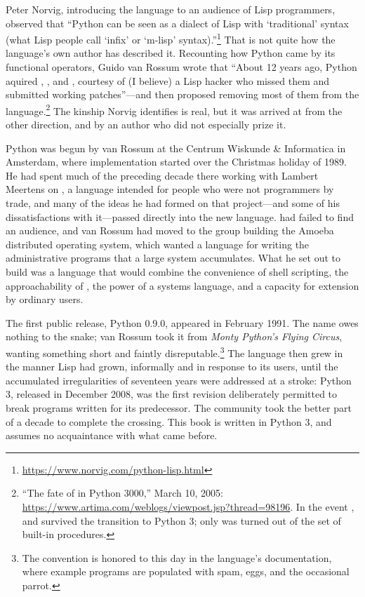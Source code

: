 Peter Norvig, introducing the language to an audience of Lisp programmers,
observed that ``Python can be seen as a dialect of Lisp with `traditional'
syntax (what Lisp people call `infix' or `m-lisp'
syntax).''\footnote{\url{https://www.norvig.com/python-lisp.html}} That is not
quite how the language's own author has described it. Recounting how Python
came by its functional operators, Guido van Rossum wrote that ``About 12 years
ago, Python aquired , ,  and
, courtesy of (I believe) a Lisp hacker who missed them and
submitted working patches''---and then proposed removing most of them from the
language.\footnote{``The fate of  in Python 3000,'' March 10,
2005: \url{https://www.artima.com/weblogs/viewpost.jsp?thread=98196}. In the
event ,  and  survived the transition to
Python 3; only  was turned out of the set of built-in procedures.}
The kinship Norvig identifies is real, but it was arrived at from the other
direction, and by an author who did not especially prize it.

Python was begun by van Rossum at the Centrum Wiskunde \& Informatica in
Amsterdam, where implementation started over the Christmas holiday of 1989. He
had spent much of the preceding decade there working with Lambert Meertens on
, a language intended for people who were not programmers by
trade, and many of the ideas he had formed on that project---and some of his
dissatisfactions with it---passed directly into the new language. 
had failed to find an audience, and van Rossum had moved to the group building
the Amoeba distributed operating system, which wanted a language for writing
the administrative programs that a large system accumulates. What he set out to
build was a language that would combine the convenience of shell scripting, the
approachability of , the power of a systems language, and a
capacity for extension by ordinary users.

The first public release, Python 0.9.0, appeared in February 1991. The name owes
nothing to the snake; van Rossum took it from \textit{Monty Python's Flying
Circus}, wanting something short and faintly disreputable.\footnote{The
convention is honored to this day in the language's documentation, where
example programs are populated with spam, eggs, and the occasional parrot.} The
language then grew in the manner Lisp had grown, informally and in response to
its users, until the accumulated irregularities of seventeen years were
addressed at a stroke: Python 3, released in December 2008, was the first
revision deliberately permitted to break programs written for its predecessor.
The community took the better part of a decade to complete the crossing. This
book is written in Python 3, and assumes no acquaintance with what came before.

